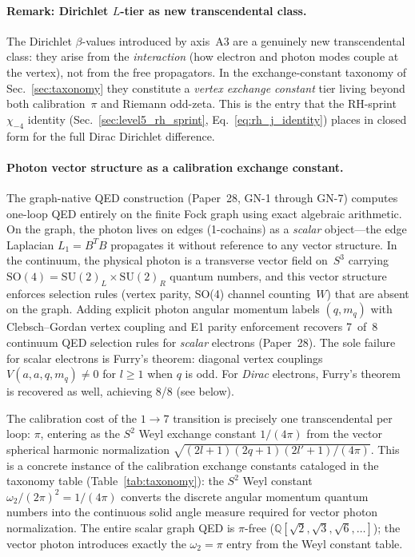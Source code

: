 \documentclass[aps,pra,twocolumn,superscriptaddress,longbibliography]{revtex4-2}
\begin{document}
\paragraph{Remark: Dirichlet $L$-tier as new transcendental class.}
The Dirichlet $\beta$-values introduced by axis~A3 are a genuinely
new transcendental class: they arise from the \emph{interaction}
(how electron and photon modes couple at the vertex), not from the
free propagators.  In the exchange-constant taxonomy of
Sec.~\ref{sec:taxonomy} they constitute a \emph{vertex exchange
constant} tier living beyond both calibration~$\pi$ and Riemann
odd-zeta.  This is the entry that the RH-sprint $\chi_{-4}$ identity
(Sec.~\ref{sec:level5_rh_sprint}, Eq.~\ref{eq:rh_j_identity}) places
in closed form for the full Dirac Dirichlet difference.

\paragraph{Photon vector structure as a calibration exchange constant.}
The graph-native QED construction (Paper~28, GN-1 through GN-7)
computes one-loop QED entirely on the finite Fock graph using exact
algebraic arithmetic.  On the graph, the photon lives on edges
(1-cochains) as a \emph{scalar} object---the edge Laplacian
$L_1 = B^T\!B$ propagates it without reference to any vector
structure.  In the continuum, the physical photon is a transverse
vector field on~$S^3$ carrying $\mathrm{SO}(4) = \mathrm{SU}(2)_L
\times \mathrm{SU}(2)_R$ quantum numbers, and this vector structure
enforces selection rules (vertex parity, SO(4) channel counting~$W$)
that are absent on the graph.  Adding explicit photon angular momentum
labels $(q, m_q)$ with Clebsch--Gordan vertex coupling and E1 parity
enforcement recovers 7~of~8 continuum QED selection rules for
\emph{scalar} electrons (Paper~28).  The sole failure for scalar
electrons is Furry's theorem: diagonal vertex couplings
$V(a,a,q,m_q) \neq 0$ for $l \geq 1$ when $q$ is odd.  For
\emph{Dirac} electrons, Furry's theorem is recovered as well,
achieving 8/8 (see below).

The calibration cost of the $1 \to 7$ transition is precisely one
transcendental per loop: $\pi$, entering as the $S^2$ Weyl exchange
constant $1/(4\pi)$ from the vector spherical harmonic normalization
$\sqrt{(2l+1)(2q+1)(2l'+1)/(4\pi)}$.  This is a concrete instance
of the calibration exchange constants cataloged in the taxonomy table
(Table~\ref{tab:taxonomy}): the $S^2$ Weyl constant $\omega_2/(2\pi)^2
= 1/(4\pi)$ converts the discrete angular momentum quantum numbers
into the continuous solid angle measure required for vector photon
normalization.  The entire scalar graph QED is $\pi$-free
($\mathbb{Q}[\sqrt{2}, \sqrt{3}, \sqrt{6}, \ldots]$); the vector
photon introduces exactly the $\omega_2 = \pi$ entry from the
Weyl constant table.
\end{document}
